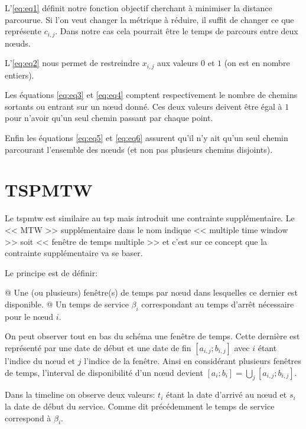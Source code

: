 \documentclass[noposter,final]{polytech/polytech}
\begin{document}
		L'\autoref{eq:eq1} définit notre fonction objectif cherchant à minimiser la distance parcourue.
		Si l'on veut changer la métrique à réduire, il suffit de changer ce que représente $c_{i,j}$.
		Dans notre cas cela pourrait être le temps de parcours entre deux n\oe uds.
		
		L'\autoref{eq:eq2} nous permet de restreindre $x_{i,j}$ aux valeurs $0$ et $1$ (on est en nombre entiers).
		
		Les équations \autoref{eq:eq3} et \autoref{eq:eq4} comptent respectivement le nombre de chemins sortants ou entrant sur un n\oe ud donné.
		Ces deux valeurs deivent être égal à $1$ pour n'avoir qu'un seul chemin passant par chaque point.
		
		Enfin les équations \autoref{eq:eq5} et \autoref{eq:eq6} assurent qu'il n'y ait qu'un seul chemin parcourant l'ensemble des n\oe uds (et non pas plusieurs chemins disjoints).
		
	
	\section{TSPMTW}
		Le \gls{tspmtw} est similaire au \gls{tsp} mais introduit une contrainte supplémentaire.
		Le << MTW >> supplémentaire dans le nom indique << multiple time window >> soit << fenêtre de temps multiple >> et c'est sur ce concept que la contrainte supplémentaire va se baser.
		
		Le principe est de définir:
		\begin{easylist}
			@ Une (ou plusieurs) fenêtre(s) de temps par n\oe ud dans lesquelles ce dernier est disponible.
			@ Un temps de service $\beta_i$ correspondant au temps d'arrêt nécessaire pour le n\oe ud $i$.
		\end{easylist}

		 
		On peut observer tout en bas du schéma une fenêtre de temps.
		Cette dernière est représenté par une date de début et une date de fin $\left[ a_{i,j}; b_{i,j}\right]$ avec $i$ étant l'indice du n\oe ud et $j$ l'indice de la fenêtre.
		Ainsi en considérant plusieurs fenêtres de temps, l'interval de disponibilité d'un n\oe ud devient $\left[ a_i;b_i\right] =\bigcup_j\left[ a_{i,j}; b_{i,j}\right]$.
		
		Dans la timeline on observe deux valeurs: $t_i$ étant la date d'arrivé au n\oe ud et $s_i$ la date de début du service.
		Comme dit précédemment le temps de service correspond à $\beta_i$.
		
\end{document}
